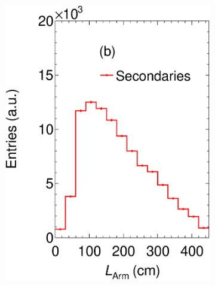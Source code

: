 \begin{figure}[!ht]
\begin{subfigure}[b]{0.32\textwidth}
         \includegraphics[width=\textwidth]{figures/ch5-KF_NDGAr/ToySample/testNDGArMirrorLAllTall.eps}
         \caption{}
         \label{fig:LGAr}
     \end{subfigure}
          \begin{subfigure}[b]{0.32\textwidth}
         \centering

\end{subfigure}
\end{figure}
